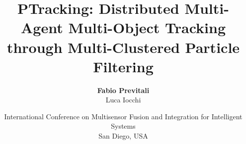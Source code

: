\documentclass{beamer}
\title[PTracking: Distributed Multi-Agent Multi-Object Tracking through M-C PF]{\Large PTracking: Distributed Multi-Agent Multi-Object Tracking
through Multi-Clustered Particle Filtering}
\subtitle{}
\author[Fabio Previtali]{\small\textbf{Fabio Previtali}\\Luca Iocchi}
\date[September 15, 2015]{\scriptsize International Conference on Multisensor Fusion and Integration for Intelligent Systems\\San Diego, USA}
\begin{document}
\begin{frame}[plain]
	\titlepage
\end{frame}





\end{document}
